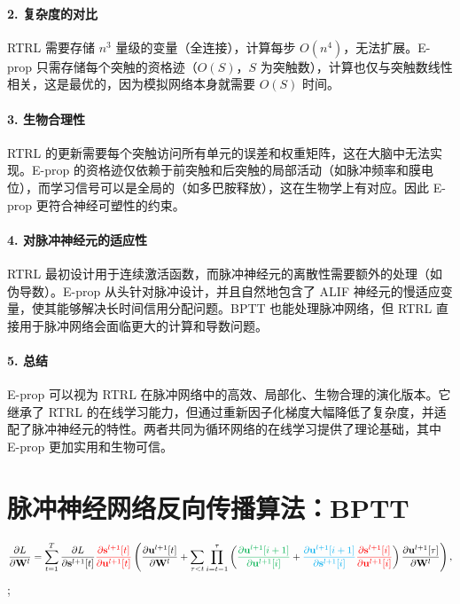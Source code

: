 \documentclass[journal,12pt,onecolumn]{IEEEtran}
\begin{document}
\paragraph{2. 复杂度的对比}
RTRL 需要存储 $n^3$ 量级的变量（全连接），计算每步 $O(n^4)$，无法扩展。E-prop 只需存储每个突触的资格迹（$O(S)$，$S$ 为突触数），计算也仅与突触数线性相关，这是最优的，因为模拟网络本身就需要 $O(S)$ 时间。

\paragraph{3. 生物合理性}
RTRL 的更新需要每个突触访问所有单元的误差和权重矩阵，这在大脑中无法实现。E-prop 的资格迹仅依赖于前突触和后突触的局部活动（如脉冲频率和膜电位），而学习信号可以是全局的（如多巴胺释放），这在生物学上有对应。因此 E-prop 更符合神经可塑性的约束。

\paragraph{4. 对脉冲神经元的适应性}
RTRL 最初设计用于连续激活函数，而脉冲神经元的离散性需要额外的处理（如伪导数）。E-prop 从头针对脉冲设计，并且自然地包含了 ALIF 神经元的慢适应变量，使其能够解决长时间信用分配问题。BPTT 也能处理脉冲网络，但 RTRL 直接用于脉冲网络会面临更大的计算和导数问题。

\paragraph{5. 总结}
E-prop 可以视为 RTRL 在脉冲网络中的高效、局部化、生物合理的演化版本。它继承了 RTRL 的在线学习能力，但通过重新因子化梯度大幅降低了复杂度，并适配了脉冲神经元的特性。两者共同为循环网络的在线学习提供了理论基础，其中 E-prop 更加实用和生物可信。







\section{脉冲神经网络反向传播算法：BPTT}


\begin{equation}
\small
    \frac{\partial L}{\partial \mathbf{W}^l}=\sum_{t=1}^T \frac{\partial L}{\partial \mathbf{s}^{l+1}[t]}{\color{red}\frac{\partial \mathbf{s}^{l+1}[t]}{\partial \mathbf{u}^{l+1}[t]}}\left(\frac{\partial \mathbf{u}^{l+1}[t]}{\partial \mathbf{W}^l}+\sum_{\tau < t}\prod_{i=t-1}^{\tau}\left({\color[rgb]{0,0.69,0.31}\frac{\partial \mathbf{u}^{l+1}[i+1]}{\partial \mathbf{u}^{l+1}[i]}}+{\color{cyan}\frac{\partial \mathbf{u}^{l+1}[i+1]}{\partial \mathbf{s}^{l+1}[i]}}{\color{red}\frac{\partial \mathbf{s}^{l+1}[i]}{\partial \mathbf{u}^{l+1}[i]}}\right)\frac{\partial \mathbf{u}^{l+1}[\tau]}{\partial \mathbf{W}^l}\right),
    \label{bptt gradient}
\end{equation} \cite{xiao_online_2022};
\end{document}
